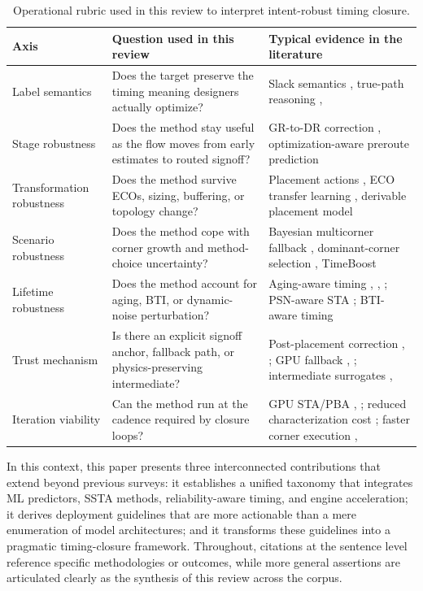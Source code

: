 \documentclass[num-refs]{wiley-article}
\begin{document}
  \begin{table}[tbp]
  \centering
  \caption{Operational rubric used in this review to interpret intent-robust timing closure.}
  \label{tab:wiley-2}
  \small
  \begin{tabularx}{\textwidth}{>{\raggedright\arraybackslash}X >{\raggedright\arraybackslash}X >{\raggedright\arraybackslash}X}
  \toprule
  \textbf{Axis} & \textbf{Question used in this review} & \textbf{Typical evidence in the literature} \\
  \midrule
  Label semantics & Does the target preserve the timing meaning designers actually optimize? & Slack semantics \cite{ref50}, true-path reasoning \cite{ref37}, \cite{ref40} \\
  Stage robustness & Does the method stay useful as the flow moves from early estimates to routed signoff? & GR-to-DR correction \cite{ref10}, optimization-aware preroute prediction \cite{ref8} \\
  Transformation robustness & Does the method survive ECOs, sizing, buffering, or topology change? & Placement actions \cite{ref1}, ECO transfer learning \cite{ref19}, derivable placement model \cite{ref3} \\
  Scenario robustness & Does the method cope with corner growth and method-choice uncertainty? & Bayesian multicorner fallback \cite{ref16}, dominant-corner selection \cite{ref28}, TimeBoost \cite{ref9} \\
  Lifetime robustness & Does the method account for aging, BTI, or dynamic-noise perturbation? & Aging-aware timing \cite{ref14}, \cite{ref15}, \cite{ref23}; PSN-aware STA \cite{ref12}; BTI-aware timing \cite{ref44} \\
  Trust mechanism & Is there an explicit signoff anchor, fallback path, or physics-preserving intermediate? & Post-placement correction \cite{ref25}, \cite{ref13}; GPU fallback \cite{ref21}, \cite{ref22}; intermediate surrogates \cite{ref17}, \cite{ref29} \\
  Iteration viability & Can the method run at the cadence required by closure loops? & GPU STA/PBA \cite{ref21}, \cite{ref22}; reduced characterization cost \cite{ref4}; faster corner execution \cite{ref16}, \cite{ref28} \\
  \bottomrule
  \end{tabularx}
  \end{table}


  In this context, this paper presents three interconnected contributions that extend beyond previous surveys: it establishes a unified taxonomy that integrates ML predictors, SSTA methods, reliability-aware timing, and engine acceleration; it derives deployment guidelines that are more actionable than a mere enumeration of model architectures; and it transforms these guidelines into a pragmatic timing-closure framework. Throughout, citations at the sentence level reference specific methodologies or outcomes, while more general assertions are articulated clearly as the synthesis of this review across the corpus.
\end{document}
